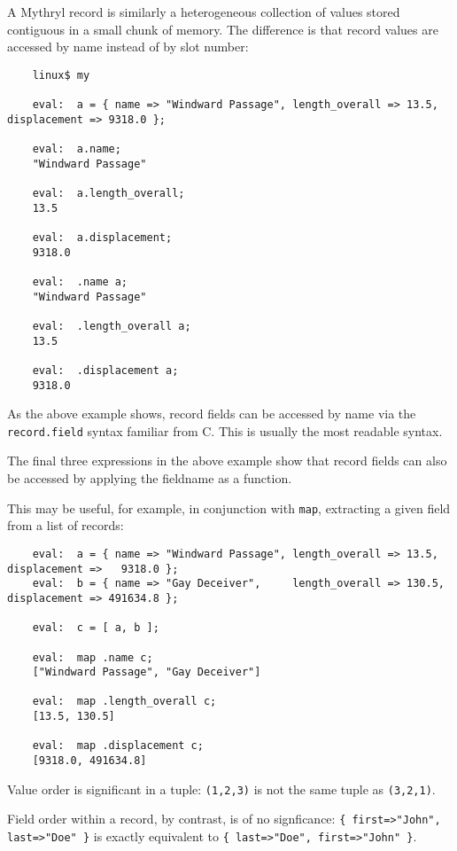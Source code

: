 A Mythryl record is similarly a heterogeneous collection of values stored 
contiguous in a small chunk of memory.  The difference is that record values 
are accessed by name instead of by slot number:

\begin{verbatim}
    linux$ my

    eval:  a = { name => "Windward Passage", length_overall => 13.5, displacement => 9318.0 }; 

    eval:  a.name;
    "Windward Passage"

    eval:  a.length_overall;
    13.5

    eval:  a.displacement;
    9318.0

    eval:  .name a;
    "Windward Passage"

    eval:  .length_overall a;
    13.5

    eval:  .displacement a;
    9318.0
\end{verbatim}

As the above example shows, record fields can be accessed by name via 
the {\tt record.field} syntax familiar from C.  This is usually the 
most readable syntax.

The final three expressions in the above example show that record 
fields can also be accessed by applying the fieldname as a function.

This may be useful, for example, in conjunction with {\tt map}, 
extracting a given field from a list of records:

\begin{verbatim}
    eval:  a = { name => "Windward Passage", length_overall => 13.5,  displacement =>   9318.0 };
    eval:  b = { name => "Gay Deceiver",     length_overall => 130.5, displacement => 491634.8 };

    eval:  c = [ a, b ];

    eval:  map .name c;
    ["Windward Passage", "Gay Deceiver"]

    eval:  map .length_overall c;
    [13.5, 130.5]

    eval:  map .displacement c;
    [9318.0, 491634.8]
\end{verbatim}

Value order is significant in a tuple: {\tt (1,2,3)} is not the 
same tuple as {\tt (3,2,1)}.

Field order within a record, by contrast, is of no signficance: 
{\tt \{ first=>"John", last=>"Doe" \}} is exactly equivalent to 
{\tt \{ last=>"Doe", first=>"John" \}}.

